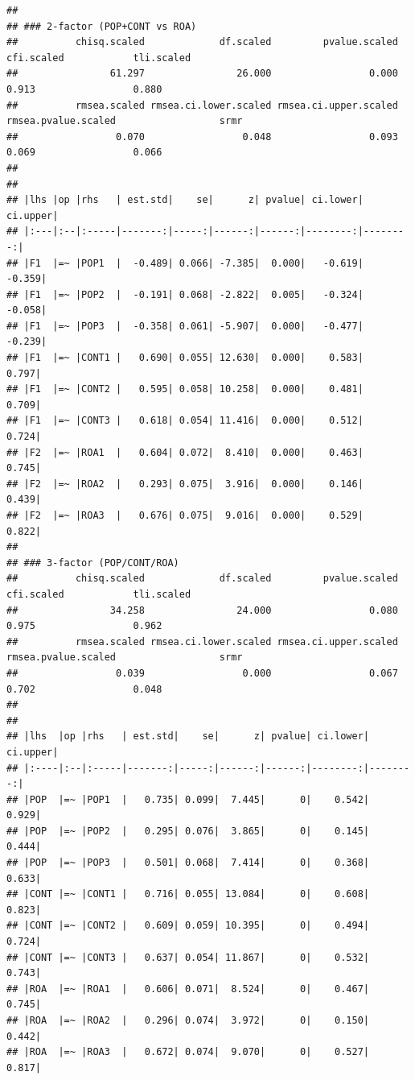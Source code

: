 \documentclass[
  10pt,
]{article}
\begin{document}
\begin{verbatim}
##
## ### 2-factor (POP+CONT vs ROA)
##          chisq.scaled             df.scaled         pvalue.scaled            cfi.scaled            tli.scaled
##                61.297                26.000                 0.000                 0.913                 0.880
##          rmsea.scaled rmsea.ci.lower.scaled rmsea.ci.upper.scaled   rmsea.pvalue.scaled                  srmr
##                 0.070                 0.048                 0.093                 0.069                 0.066
##
##
## |lhs |op |rhs   | est.std|    se|      z| pvalue| ci.lower| ci.upper|
## |:---|:--|:-----|-------:|-----:|------:|------:|--------:|--------:|
## |F1  |=~ |POP1  |  -0.489| 0.066| -7.385|  0.000|   -0.619|   -0.359|
## |F1  |=~ |POP2  |  -0.191| 0.068| -2.822|  0.005|   -0.324|   -0.058|
## |F1  |=~ |POP3  |  -0.358| 0.061| -5.907|  0.000|   -0.477|   -0.239|
## |F1  |=~ |CONT1 |   0.690| 0.055| 12.630|  0.000|    0.583|    0.797|
## |F1  |=~ |CONT2 |   0.595| 0.058| 10.258|  0.000|    0.481|    0.709|
## |F1  |=~ |CONT3 |   0.618| 0.054| 11.416|  0.000|    0.512|    0.724|
## |F2  |=~ |ROA1  |   0.604| 0.072|  8.410|  0.000|    0.463|    0.745|
## |F2  |=~ |ROA2  |   0.293| 0.075|  3.916|  0.000|    0.146|    0.439|
## |F2  |=~ |ROA3  |   0.676| 0.075|  9.016|  0.000|    0.529|    0.822|
##
## ### 3-factor (POP/CONT/ROA)
##          chisq.scaled             df.scaled         pvalue.scaled            cfi.scaled            tli.scaled
##                34.258                24.000                 0.080                 0.975                 0.962
##          rmsea.scaled rmsea.ci.lower.scaled rmsea.ci.upper.scaled   rmsea.pvalue.scaled                  srmr
##                 0.039                 0.000                 0.067                 0.702                 0.048
##
##
## |lhs  |op |rhs   | est.std|    se|      z| pvalue| ci.lower| ci.upper|
## |:----|:--|:-----|-------:|-----:|------:|------:|--------:|--------:|
## |POP  |=~ |POP1  |   0.735| 0.099|  7.445|      0|    0.542|    0.929|
## |POP  |=~ |POP2  |   0.295| 0.076|  3.865|      0|    0.145|    0.444|
## |POP  |=~ |POP3  |   0.501| 0.068|  7.414|      0|    0.368|    0.633|
## |CONT |=~ |CONT1 |   0.716| 0.055| 13.084|      0|    0.608|    0.823|
## |CONT |=~ |CONT2 |   0.609| 0.059| 10.395|      0|    0.494|    0.724|
## |CONT |=~ |CONT3 |   0.637| 0.054| 11.867|      0|    0.532|    0.743|
## |ROA  |=~ |ROA1  |   0.606| 0.071|  8.524|      0|    0.467|    0.745|
## |ROA  |=~ |ROA2  |   0.296| 0.074|  3.972|      0|    0.150|    0.442|
## |ROA  |=~ |ROA3  |   0.672| 0.074|  9.070|      0|    0.527|    0.817|

\end{verbatim}
\end{document}
